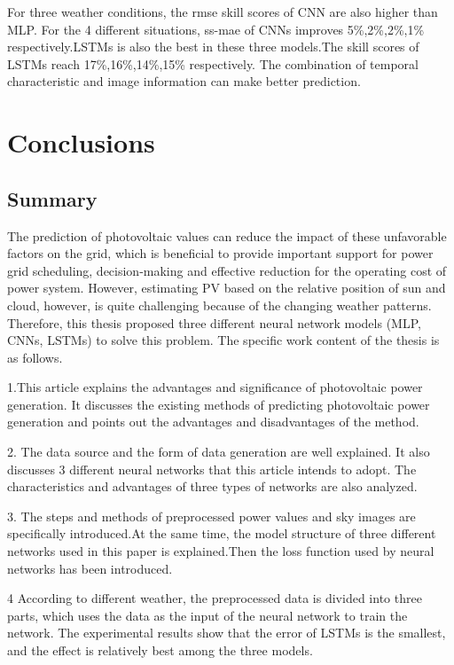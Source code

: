 For three weather conditions, the rmse skill scores of CNN are also higher than MLP. For the 4 different situations, ss-mae of CNNs improves 5\%,2\%,2\%,1\% respectively.LSTMs is also the best in these three models.The skill scores of LSTMs reach 17\%,16\%,14\%,15\% respectively. The combination of  temporal characteristic and image information can make better prediction.








\chapter{Conclusions}
\section{Summary}

The prediction of photovoltaic values can reduce the impact of these unfavorable factors on the grid, which is beneficial to provide important support for power grid scheduling, decision-making and effective reduction for the operating cost of power system. 
However, estimating PV based on the relative position of sun and cloud, however, is quite challenging because of the changing weather patterns.
Therefore, this thesis proposed three different neural network models (MLP, CNNs, LSTMs) to solve this problem. The specific work content of the thesis is as follows.


1.This article explains the advantages and significance of photovoltaic power generation. It discusses the existing methods of predicting photovoltaic power generation and points out the advantages and disadvantages of the method.

2. The data source and the form of data generation are well explained. It also discusses 3 different neural networks that this article intends to adopt. The characteristics and advantages of three types of networks are also analyzed.

3. The steps and methods of preprocessed power values and sky images are specifically introduced.At the same time, the model structure of three different networks used in this paper is explained.Then the loss function used by neural networks has been introduced.

4 According to different weather, the preprocessed data is divided into three parts, which  uses the data as the input of the neural network to train the network. The experimental results show that the error of LSTMs is the smallest, and the effect is relatively best among the three models.



